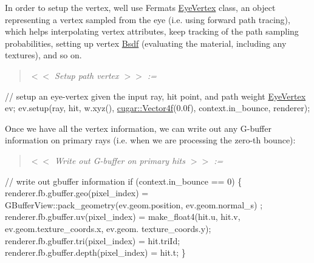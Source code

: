 \begin{DoxyParagraph}{}
In order to setup the vertex, we\textquotesingle{}ll use Fermat\textquotesingle{}s \hyperlink{struct_eye_vertex}{Eye\+Vertex} class, an object representing a vertex sampled from the eye (i.\+e. using forward path tracing), which helps interpolating vertex attributes, keep tracking of the path sampling probabilities, setting up vertex \hyperlink{struct_bsdf}{Bsdf} (evaluating the material, including any textures), and so on. ~\newline
\label{_hello_renderer_page_Setup_path_vertex_anchor}%
%
 \begin{quote}
{\itshape  $<$$<$ Setup path vertex $>$$>$ \+:= }

\end{quote}

\begin{DoxyCode}
\textcolor{comment}{// setup an eye-vertex given the input ray, hit point, and path weight}
\hyperlink{struct_eye_vertex}{EyeVertex} ev;
ev.setup(ray, hit, w.xyz(), \hyperlink{structcugar_1_1_vector}{cugar::Vector4f}(0.0f), context.in\_bounce, renderer);
\end{DoxyCode}

\end{DoxyParagraph}
\begin{DoxyParagraph}{}
Once we have all the vertex information, we can write out any G-\/buffer information on primary rays (i.\+e. when we are processing the zero-\/th bounce)\+: ~\newline
\label{_hello_renderer_page_Write_out_G-buffer_on_primary_hits_anchor}%
%
 \begin{quote}
{\itshape  $<$$<$ Write out G-\/buffer on primary hits $>$$>$ \+:= }

\end{quote}

\begin{DoxyCode}
\textcolor{comment}{// write out gbuffer information}
\textcolor{keywordflow}{if} (context.in\_bounce == 0)
\{
    renderer.fb.gbuffer.geo(pixel\_index)   = GBufferView::pack\_geometry(ev.geom.position, ev.geom.normal\_s)
      ;
    renderer.fb.gbuffer.uv(pixel\_index)    = make\_float4(hit.u, hit.v, ev.geom.texture\_coords.x, ev.geom.
      texture\_coords.y);
    renderer.fb.gbuffer.tri(pixel\_index)   = hit.triId;
    renderer.fb.gbuffer.depth(pixel\_index) = hit.t;
\}
\end{DoxyCode}

\end{DoxyParagraph}
